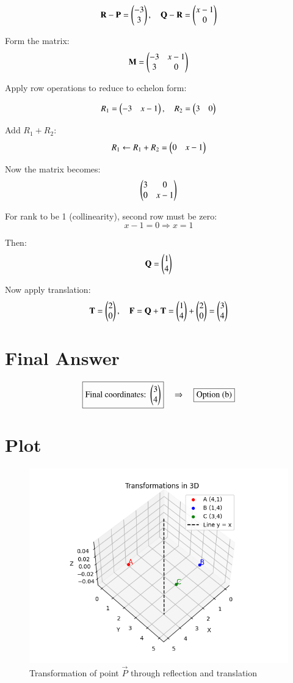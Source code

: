 \documentclass[journal]{IEEEtran}
\begin{document}
\[
\mathbf{R} - \mathbf{P} = \begin{pmatrix}-3 \\ 3\end{pmatrix}, \quad
\mathbf{Q} - \mathbf{R} = \begin{pmatrix}x - 1 \\ 0\end{pmatrix}
\]

Form the matrix:
\[
\mathbf{M} = \begin{pmatrix}-3 & x - 1 \\ 3 & 0\end{pmatrix}
\]

Apply row operations to reduce to echelon form:

\[
R_1 = \begin{pmatrix}-3 & x - 1\end{pmatrix}, \quad
R_2 = \begin{pmatrix}3 & 0\end{pmatrix}
\]

Add \( R_1 + R_2 \):
\[
R_1 \leftarrow R_1 + R_2 = \begin{pmatrix}0 & x - 1\end{pmatrix}
\]

Now the matrix becomes:
\[
\begin{pmatrix}3 & 0 \\ 0 & x - 1\end{pmatrix}
\]

For rank to be 1 (collinearity), second row must be zero:
\[
x - 1 = 0 \Rightarrow x = 1
\]

Then:
\[
\mathbf{Q} = \begin{pmatrix}1 \\ 4\end{pmatrix}
\]

Now apply translation:
\[
\mathbf{T} = \begin{pmatrix}2 \\ 0\end{pmatrix}, \quad
\mathbf{F} = \mathbf{Q} + \mathbf{T} = \begin{pmatrix}1 \\ 4\end{pmatrix} + \begin{pmatrix}2 \\ 0\end{pmatrix} = \begin{pmatrix}3 \\ 4\end{pmatrix}
\]

\section*{\large\textbf{Final Answer}}

\[
\boxed{
\text{Final coordinates: } \begin{pmatrix}3 \\ 4\end{pmatrix}
}
\quad \Rightarrow \quad \boxed{\text{Option (b)}}
\]

\section*{\large\textbf{Plot}}

\begin{figure}[h!]
\centering
\includegraphics[width=0.85\linewidth]{Figs/Fig1.png}
\caption{Transformation of point \( \vec{P} \) through reflection and translation}
\end{figure}
\end{document}
